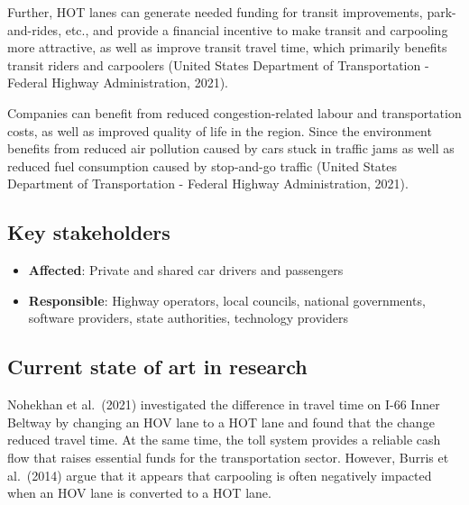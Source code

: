 \documentclass[
]{book}
\providecommand{\tightlist}{%
  \setlength{\itemsep}{0pt}\setlength{\parskip}{0pt}}
\begin{document}
Further, HOT lanes can generate needed funding for transit improvements, park-and-rides, etc., and provide a financial incentive to make transit and carpooling more attractive, as well as improve transit travel time, which primarily benefits transit riders and carpoolers (United States Department of Transportation - Federal Highway Administration, 2021).

Companies can benefit from reduced congestion-related labour and transportation costs, as well as improved quality of life in the region. Since the environment benefits from reduced air pollution caused by cars stuck in traffic jams as well as reduced fuel consumption caused by stop-and-go traffic (United States Department of Transportation - Federal Highway Administration, 2021).

\hypertarget{key-stakeholders-3}{%
\subsection*{Key stakeholders}\label{key-stakeholders-3}}

\begin{itemize}
\tightlist
\item
  \textbf{Affected}: Private and shared car drivers and passengers
\item
  \textbf{Responsible}: Highway operators, local councils, national governments, software providers, state authorities, technology providers
\end{itemize}

\hypertarget{current-state-of-art-in-research-3}{%
\subsection*{Current state of art in research}\label{current-state-of-art-in-research-3}}

Nohekhan et al.~(2021) investigated the difference in travel time on I-66 Inner Beltway by changing an HOV lane to a HOT lane and found that the change reduced travel time. At the same time, the toll system provides a reliable cash flow that raises essential funds for the transportation sector. However, Burris et al.~(2014) argue that it appears that carpooling is often negatively impacted when an HOV lane is converted to a HOT lane.
\end{document}
